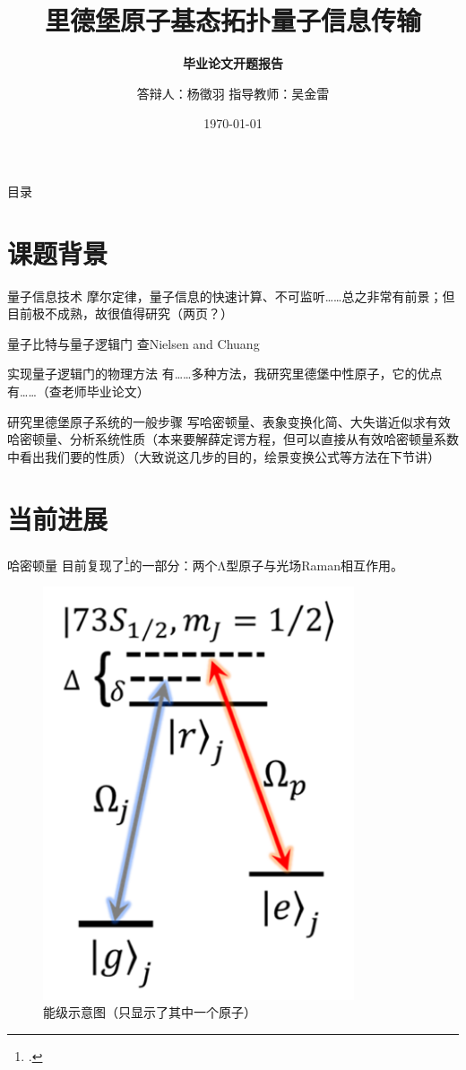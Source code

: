 \documentclass[10pt,aspectratio=43]{beamer}
\title{里德堡原子基态拓扑量子信息传输}
\subtitle{\fontsize{9pt}{14pt}\textbf{毕业论文开题报告}}
\author{答辩人：杨徵羽 \quad 指导教师：吴金雷}
\institute{哈尔滨工业大学(威海)理学院}
\date{\today}
\begin{document}
\frame{\titlepage}

\section[目录]{}   %
\begin{frame}{目录}
\tableofcontents
\end{frame}

\section{课题背景}
\begin{frame}{量子信息技术}
摩尔定律，量子信息的快速计算、不可监听……总之非常有前景；但目前极不成熟，故很值得研究（两页？）
\end{frame}
\begin{frame}{量子比特与量子逻辑门}
查Nielsen and Chuang
\end{frame}
\begin{frame}{实现量子逻辑门的物理方法}
有……多种方法，我研究里德堡中性原子，它的优点有……（查老师毕业论文）
\end{frame}
\begin{frame}{研究里德堡原子系统的一般步骤}
写哈密顿量、表象变换化简、大失谐近似求有效哈密顿量、分析系统性质（本来要解薛定谔方程，但可以直接从有效哈密顿量系数中看出我们要的性质）（大致说这几步的目的，绘景变换公式等方法在下节讲）
\end{frame}
\section{当前进展}
\begin{frame}{哈密顿量}
目前复现了\footcite{PhysRevA.105.032417}的一部分：两个Λ型原子与光场Raman相互作用。
\begin{figure}
\centering
\includegraphics[height=0.5\textheight]{figures/pra-energy-level}
\caption{能级示意图（只显示了其中一个原子）}
\label{fig:pra-energy-level}
\end{figure}
\end{frame}
\end{document}
